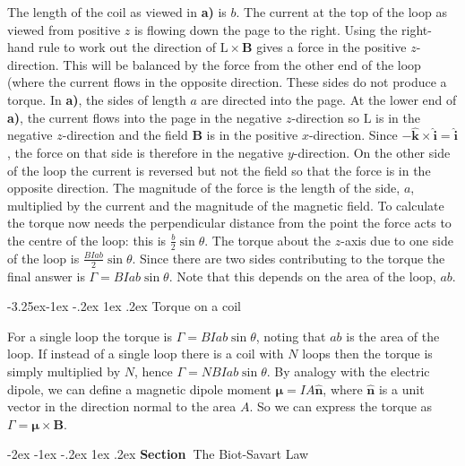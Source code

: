 \documentclass[
]{book}
\makeatletter
\renewcommand\section{%
\@startsection{section}{1}{\z@}%
              {-2ex \@plus -1ex \@minus -.2ex}%
              {1ex \@plus .2ex}%
              {\sffamily\bfseries\large\noindent Section~}}
\renewcommand\subsection{%
\@startsection{subsection}{2}{\z@}%
              {-3.25ex\@plus -1ex \@minus -.2ex}%
              {1ex \@plus .2ex}%
              {\sffamily\bfseries}}
\numberwithin{equation}{section}
\makeatother
\begin{document}
The length of the coil as viewed in \textbf{a)} is \(b\). The current at the
top of the loop as viewed from positive \(z\) is flowing down the page to
the right. Using the right-hand rule to work out the direction of
\(\mathrm{L} \times \mathbf{B}\) gives a force in the positive \(z\)-direction. This will be
balanced by the force from the other end of the loop (where the current
flows in the opposite direction. These sides do not produce a torque. In
\textbf{a)}, the sides of length \(a\) are directed into the page. At the lower
end of \textbf{a)}, the current flows into the page in the negative
\(z\)-direction so \(\mathrm{L}\) is in the negative \(z\)-direction and the field
\(\mathbf{B}\) is in the positive \(x\)-direction. Since
\(-\hat{\mathbf{k}} \times \hat{\mathbf{i}} = \hat{\mathbf{i}}\), the force on that side is
therefore in the negative \(y\)-direction. On the other side of the loop
the current is reversed but not the field so that the force is in the
opposite direction. The magnitude of the force is the length of the
side, \(a\), multiplied by the current and the magnitude of the magnetic
field. To calculate the torque now needs the perpendicular distance from
the point the force acts to the centre of the loop: this is
\(\frac{b}{2}\sin\theta\). The torque about the \(z\)-axis due to one side
of the loop is \(\frac{BIab}{2} \sin \theta\). Since there are two sides
contributing to the torque the final answer is
\(\Gamma = BIab \sin\theta\). Note that this depends on the area of the
loop, \(ab\).

\hypertarget{torque-on-a-coil}{%
\subsection{Torque on a coil}\label{torque-on-a-coil}}

For a single loop the torque is \(\Gamma = BIab \sin\theta\), noting that
\(ab\) is the area of the loop. If instead of a single loop there is a
coil with \(N\) loops then the torque is simply multiplied by \(N\), hence
\(\Gamma = NBIab \sin\theta\). By analogy with the electric dipole, we can
define a magnetic dipole moment \(\boldsymbol{\mu} = IA \hat{\mathbf{n}}\), where
\(\hat{\mathbf{n}}\) is a unit vector in the direction normal to the area \(A\). So
we can express the torque as \(\Gamma = \boldsymbol{\mu} \times \mathbf{B}\).

\hypertarget{the-biot-savart-law}{%
\section{The Biot-Savart Law}\label{the-biot-savart-law}}
\end{document}
